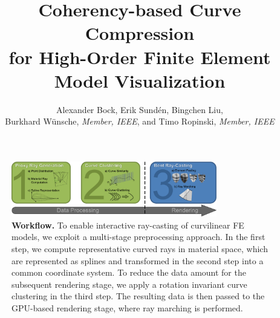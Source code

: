\documentclass[journal]{vgtc}                %
\title{Coherency-based Curve Compression\\ for High-Order Finite Element Model Visualization}
\author{Alexander Bock, Erik Sund\'en, Bingchen Liu,\\Burkhard W{\"u}nsche, \textit{Member, IEEE}, and Timo Ropinski, \textit{Member, IEEE}}
\begin{document}
%
%
\label{sec:introduction}
%
\maketitle
%
\begin{figure}[t]
    \centering
    \includegraphics[width=0.8\textwidth]{figures/workflow-new.pdf}
    \caption{\textbf{Workflow.} To enable interactive ray-casting of curvilinear FE models, we exploit a multi-stage preprocessing approach. In the first step, we compute representative curved rays in material space, which are represented as splines and transformed in the second step into a common coordinate system. To reduce the data amount for the subsequent rendering stage, we apply a rotation invariant curve clustering in the third step. The resulting data is then passed to the GPU-based rendering stage, where ray marching is performed.}
    \label{fig:workflow}
\end{figure}
%
%
%
\end{document}
